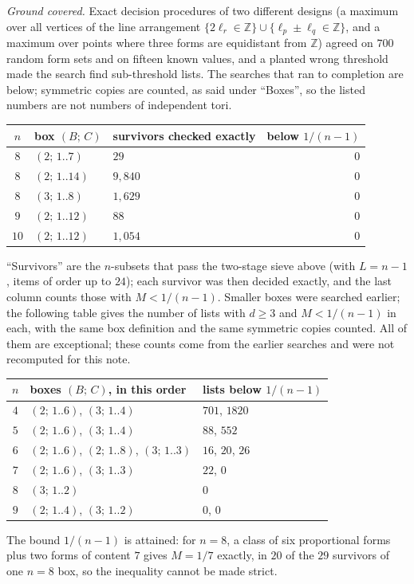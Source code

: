 \documentclass[11pt]{amsart}
\theoremstyle{definition}
\theoremstyle{remark}
\newcommand{\Z}{\mathbb{Z}}
\begin{document}
\emph{Ground covered.} Exact decision procedures of two different designs (a maximum over all vertices of the line arrangement $\{2\ell_r\in\Z\}\cup\{\ell_p\pm\ell_q\in\Z\}$, and a maximum over points where three forms are equidistant from $\Z$) agreed on $700$ random form sets and on fifteen known values, and a planted wrong threshold made the search find sub-threshold lists. The searches that ran to completion are below; symmetric copies are counted, as said under ``Boxes'', so the listed numbers are not numbers of independent tori.
\begin{center}
\small
\begin{tabular}{@{}cllr@{}}
\toprule
$n$ & box $(B;\,C)$ & survivors checked exactly & below $1/(n-1)$\\
\midrule
$8$ & $(2;\,1..7)$ & $29$ & $0$\\
$8$ & $(2;\,1..14)$ & $9{,}840$ & $0$\\
$8$ & $(3;\,1..8)$ & $1{,}629$ & $0$\\
$9$ & $(2;\,1..12)$ & $88$ & $0$\\
$10$ & $(2;\,1..12)$ & $1{,}054$ & $0$\\
\bottomrule
\end{tabular}
\end{center}
``Survivors'' are the $n$-subsets that pass the two-stage sieve above (with $L=n-1$, items of order up to $24$); each survivor was then decided exactly, and the last column counts those with $M<1/(n-1)$. Smaller boxes were searched earlier; the following table gives the number of lists with $d\ge3$ and $M<1/(n-1)$ in each, with the same box definition and the same symmetric copies counted. All of them are exceptional; these counts come from the earlier searches and were not recomputed for this note.
\begin{center}
\small
\begin{tabular}{@{}cll@{}}
\toprule
$n$ & boxes $(B;\,C)$, in this order & lists below $1/(n-1)$\\
\midrule
$4$ & $(2;\,1..6)$, $(3;\,1..4)$ & $701$, $1820$\\
$5$ & $(2;\,1..6)$, $(3;\,1..4)$ & $88$, $552$\\
$6$ & $(2;\,1..6)$, $(2;\,1..8)$, $(3;\,1..3)$ & $16$, $20$, $26$\\
$7$ & $(2;\,1..6)$, $(3;\,1..3)$ & $22$, $0$\\
$8$ & $(3;\,1..2)$ & $0$\\
$9$ & $(2;\,1..4)$, $(3;\,1..2)$ & $0$, $0$\\
\bottomrule
\end{tabular}
\end{center}
The bound $1/(n-1)$ is attained: for $n=8$, a class of six proportional forms plus two forms of content $7$ gives $M=1/7$ exactly, in $20$ of the $29$ survivors of one $n=8$ box, so the inequality cannot be made strict.
\end{document}
